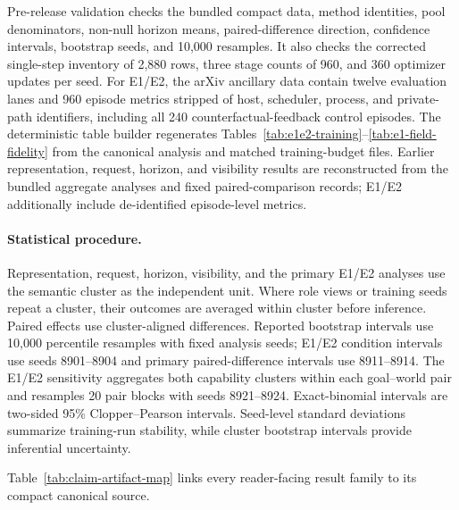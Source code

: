 \documentclass[10pt]{article}
\begin{document}
Pre-release validation checks the bundled compact data, method identities, pool denominators, non-null horizon means, paired-difference direction, confidence intervals, bootstrap seeds, and 10,000 resamples. It also checks the corrected single-step inventory of 2,880 rows, three stage counts of 960, and 360 optimizer updates per seed. For E1/E2, the arXiv ancillary data contain twelve evaluation lanes and 960 episode metrics stripped of host, scheduler, process, and private-path identifiers, including all 240 counterfactual-feedback control episodes. The deterministic table builder regenerates Tables~\ref{tab:e1e2-training}--\ref{tab:e1-field-fidelity} from the canonical analysis and matched training-budget files. Earlier representation, request, horizon, and visibility results are reconstructed from the bundled aggregate analyses and fixed paired-comparison records; E1/E2 additionally include de-identified episode-level metrics.

\paragraph{Statistical procedure.}
Representation, request, horizon, visibility, and the primary E1/E2 analyses use the semantic cluster as the independent unit. Where role views or training seeds repeat a cluster, their outcomes are averaged within cluster before inference. Paired effects use cluster-aligned differences. Reported bootstrap intervals use 10,000 percentile resamples with fixed analysis seeds; E1/E2 condition intervals use seeds 8901--8904 and primary paired-difference intervals use 8911--8914. The E1/E2 sensitivity aggregates both capability clusters within each goal--world pair and resamples 20 pair blocks with seeds 8921--8924. Exact-binomial intervals are two-sided 95\% Clopper--Pearson intervals. Seed-level standard deviations summarize training-run stability, while cluster bootstrap intervals provide inferential uncertainty.


Table~\ref{tab:claim-artifact-map} links every reader-facing result family to its compact canonical source.
\end{document}
